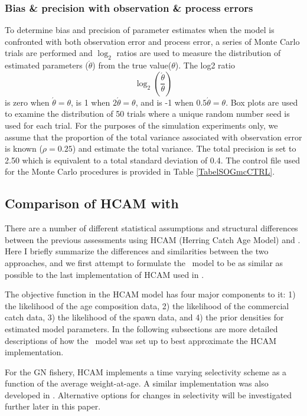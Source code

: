		\subsubsection{Bias \& precision with observation \& process errors}
To determine bias and precision of parameter estimates when the model is confronted with both observation error and process error, a series of Monte Carlo trials are performed and $\log_2$ ratios are used to measure the distribution of estimated parameters ($\acute{\theta}$) from the true value($\theta$).  The log2 ratio
\[ \log_2\left(\frac{\acute{\theta}}{\theta}\right) \] is zero when $\acute{\theta}=\theta$, is 1 when $2\acute{\theta}=\theta$, and is -1 when $0.5\acute{\theta}=\theta$.  Box plots are used to examine the distribution of 50 trials where a unique random number seed is used for each trial.  For the purposes of the simulation experiments only, we assume that the proportion of the total variance associated with observation error is known ($\rho = 0.25$) and estimate the total variance.  The total precision is set to 2.50 which is equivalent to a total standard deviation of 0.4.  The control file used for the Monte Carlo procedures is provided in Table \ref{TabelSOGmcCTRL}.


\subsection{Comparison of HCAM with \iscam}\label{secMethodsHCAM}
	
	There are a number of different statistical assumptions and structural differences between the previous assessments using HCAM (Herring Catch Age Model) and \iscam.	  Here I briefly summarize the differences and similarities between the two approaches, and we first attempt to formulate the \iscam\ model to be as similar as possible to the last implementation of HCAM used in \cite{Clear2010}.
	
	The objective function in the HCAM model has four major components to it: 1) the likelihood of the age composition data, 2) the likelihood of the commercial catch data, 3) the likelihood of the spawn data, and 4) the prior densities for estimated model parameters.  In the following subsections are more detailed descriptions of how the \iscam\ model was set up to best approximate the HCAM implementation.
	
	For the GN fishery, HCAM implements a time varying selectivity scheme as a function of the average weight-at-age. A similar implementation was also developed in \iscam. Alternative options for changes in selectivity will be investigated further later in this paper.
	
